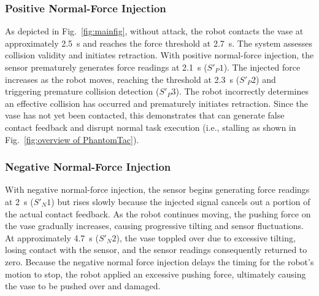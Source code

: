 \subsubsection{Positive Normal-Force Injection}
As depicted in Fig.~\ref{fig:mainfig}, without attack, the robot contacts the vase at approximately 2.5~s and reaches the force threshold at 2.7~s. 
The system assesses collision validity and initiates retraction.
With positive normal-force injection, the sensor prematurely generates force readings at 2.1~s ($S'_P1$). The injected force increases as the robot moves, reaching the threshold at 2.3~s ($S'_P2$) and triggering premature collision detection ($S'_P3$). The robot incorrectly determines an effective collision has occurred and prematurely initiates retraction. Since the vase has not yet been contacted, this demonstrates that {\name} can generate false contact feedback and disrupt normal task execution (i.e., stalling as shown in Fig.~\ref{fig:overview of PhantomTac}).

\subsubsection{Negative Normal-Force Injection}
With negative normal-force injection, the sensor begins generating force readings at 2~s ($S'_N1$) but rises slowly because the injected signal cancels out a portion of the actual contact feedback. 
As the robot continues moving, the pushing force on the vase gradually increases, causing progressive tilting and sensor fluctuations. 
At approximately 4.7~s ($S'_N2$), the vase toppled over due to excessive tilting, losing contact with the sensor, and the sensor readings consequently returned to zero. 
Because the negative normal force injection delays the timing for the robot's motion to stop, the robot applied an excessive pushing force, ultimately causing the vase to be pushed over and damaged.

